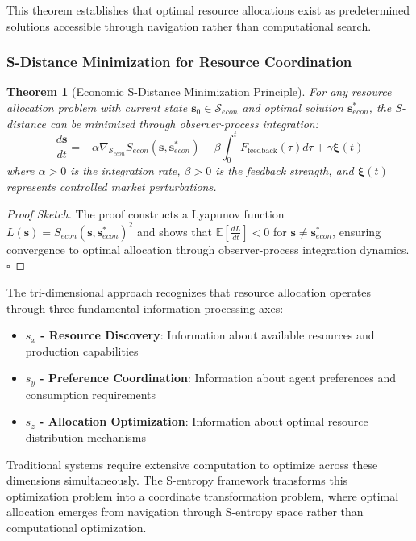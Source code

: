 \documentclass[12pt,a4paper]{article}
\newtheorem{theorem}{Theorem}
\begin{document}
This theorem establishes that optimal resource allocations exist as predetermined solutions accessible through navigation rather than computational search.

\subsubsection{S-Distance Minimization for Resource Coordination}

\begin{theorem}[Economic S-Distance Minimization Principle]
For any resource allocation problem with current state $\mathbf{s}_0 \in \mathcal{S}_{econ}$ and optimal solution $\mathbf{s}^*_{econ}$, the S-distance can be minimized through observer-process integration:
\begin{equation}
\frac{d\mathbf{s}}{dt} = -\alpha \nabla_{\mathcal{S}_{econ}} S_{econ}(\mathbf{s}, \mathbf{s}^*_{econ}) - \beta \int_0^t F_{\text{feedback}}(\tau) d\tau + \gamma \mathbf{\xi}(t)
\end{equation}
where $\alpha > 0$ is the integration rate, $\beta > 0$ is the feedback strength, and $\mathbf{\xi}(t)$ represents controlled market perturbations.
\end{theorem}

\begin{proof}[Proof Sketch]
The proof constructs a Lyapunov function $L(\mathbf{s}) = S_{econ}(\mathbf{s}, \mathbf{s}^*_{econ})^2$ and shows that $\mathbb{E}[\frac{dL}{dt}] < 0$ for $\mathbf{s} \neq \mathbf{s}^*_{econ}$, ensuring convergence to optimal allocation through observer-process integration dynamics. $\square$
\end{proof}

The tri-dimensional approach recognizes that resource allocation operates through three fundamental information processing axes:
\begin{itemize}
\item \textbf{$s_x$ - Resource Discovery}: Information about available resources and production capabilities
\item \textbf{$s_y$ - Preference Coordination}: Information about agent preferences and consumption requirements  
\item \textbf{$s_z$ - Allocation Optimization}: Information about optimal resource distribution mechanisms
\end{itemize}

Traditional systems require extensive computation to optimize across these dimensions simultaneously. The S-entropy framework transforms this optimization problem into a coordinate transformation problem, where optimal allocation emerges from navigation through S-entropy space rather than computational optimization.
\end{document}
